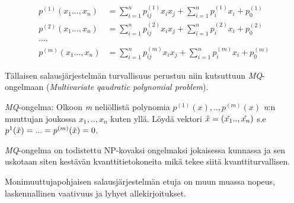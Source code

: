     \begin{align*}
        p^{(1)}(x_{1}...,x_{n}) &= \sum_{i=1}^{n} p_{ij}^{(1)}x_{i}x_ {j}+\sum_{i=1}^{n}p_ {i}^{(1)}x_{i}+p_ {0}^{(1)} \\
        p^{(2)}(x_{1}...,x_{n}) &= \sum_{i=1}^{n} p_{ij}^{(2)}x_{i}x_ {j}+\sum_{i=1}^{n}p_ {i}^{(2)}x_{i}+p_ {0}^{(2)} \\
        ..., \\
        p^{(m)}(x_{1}...,x_{n}) &= \sum_{i=1}^{n} p_{ij}^{(m)}x_{i}x_ {j}+\sum_{i=1}^{n}p_ {i}^{(m)}x_{i}+p_ {0}^{(m)}
    \end{align*}
    
Tällaisen salausjärjestelmän turvallisuus perustuu niin kutsuttuun \emph{MQ}-ongelmaan (\emph{Multivariate qaudratic polynomial problem}).

\emph{MQ}-ongelma: Olkoon \emph{m} neliöllistä polynomia $p^{(1)}(x), .., p^{(m)}(x)$ \emph{n}:n muuttujan joukossa $x_{1}, .., x_{n}$ kuten yllä. Löydä vektori $\Tilde{x}=(\Tilde{x_{1}} .., \Tilde{x_{n}})$ s.e $p^{1}(\Tilde{x})=...=p^{(m)}(\Tilde{x})=0$.

\emph{MQ}-ongelma on todistettu NP-kovaksi ongelmaksi jokaisessa kunnassa ja sen uskotaan siten kestävän kvanttitietokoneita mikä tekee siitä kvanttiturvallisen.

Monimuuttujapohjaisen salausjärjestelmän etuja on muun muassa nopeus, laskennallinen vaativuus ja lyhyet allekirjoitukset.